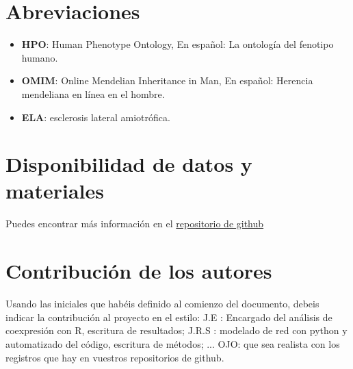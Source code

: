 \documentclass{bmcart}
\begin{document}
	\begin{backmatter}
	
		\section*{Abreviaciones}%
		\begin{itemize}
			\item \textbf{HPO}: Human Phenotype Ontology, En español: La ontología del fenotipo humano.
			\item \textbf{OMIM}: Online Mendelian Inheritance in Man, En español: Herencia mendeliana en línea en el hombre.
			\item \textbf{ELA}: esclerosis lateral amiotrófica.
		\end{itemize}
		
		\section*{Disponibilidad de datos y materiales}%
			
			
			Puedes encontrar más información en el \href{https://github.com/Diegodepab/project_template}{repositorio de github}
			 
			
		\section*{Contribución de los autores}
			Usando las iniciales que habéis definido al comienzo del documento, debeis indicar la contribución al proyecto en el estilo:
			J.E : Encargado del análisis de coexpresión con R, escritura de resultados; J.R.S : modelado de red con python y automatizado del código, escritura de métodos; ...
			OJO: que sea realista con los registros que hay en vuestros repositorios de github. 
		
		
		
	
	\end{backmatter}
\end{document}
